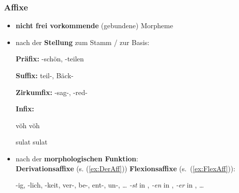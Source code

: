 \begin{frame}
\frametitle{Affixe}
	
	\begin{itemize}
		\item \textbf{nicht frei vorkommende} (gebundene) Morpheme
		
		\item nach der \textbf{Stellung} zum Stamm / zur Basis:
		
		\settowidth{} 
		\ea
			\ea \textbf{Präfix:} -schön, -teilen
		
			\ex \textbf{Suffix:} teil-, Bäck-
		
			\ex \textbf{Zirkumfix:} -sag-, -red-
		
			\ex \textbf{Infix:} 
			
			 v\u{o}h  \ras v\u{o}h  
			 
			sulat  \ras sulat  
		
			\z 
		\z 

\pause 
		
		\item nach der \textbf{morphologischen Funktion}: \\
		\textbf{Derivationsaffixe} (s. (\ref{ex:DerAff})) \vs \textbf{Flexionsaffixe} (s.\ (\ref{ex:FlexAff})):
		
		\ea 
		\ea\label{ex:DerAff} -ig, -lich, -keit, ver-, be-, ent-, un-, \dots
		\ex\label{ex:FlexAff} \emph{-st} in , \emph{-en} in , \emph{-er} in , \dots
		\z
		\z 
	\end{itemize}

\end{frame}


